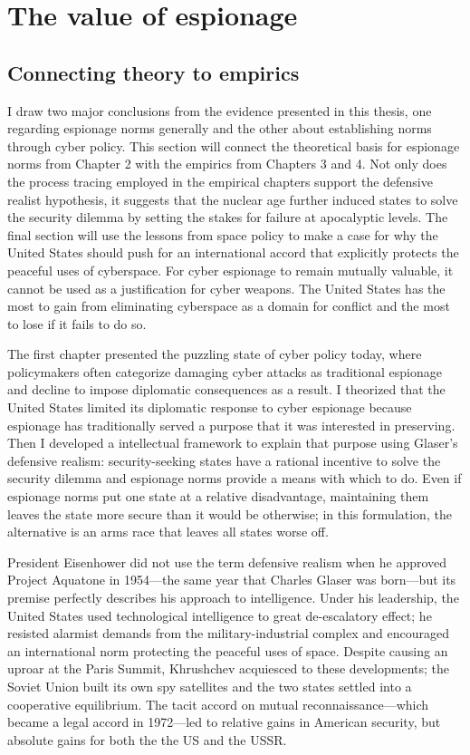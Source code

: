 \documentclass[11pt]{memoir}
\begin{document}
\section{The value of espionage}
\subsection{Connecting theory to empirics}
I draw two major conclusions from the evidence presented in this thesis, one regarding espionage norms generally and the other about establishing norms through cyber policy. This section will connect the theoretical basis for espionage norms from Chapter 2 with the empirics from Chapters 3 and 4. Not only does the process tracing employed in the empirical chapters support the defensive realist hypothesis, it suggests that the nuclear age further induced states to solve the security dilemma by setting the stakes for failure at apocalyptic levels. The final section will use the lessons from space policy to make a case for why the United States should push for an international accord that explicitly protects the peaceful uses of cyberspace. For cyber espionage to remain mutually valuable, it cannot be used as a justification for cyber weapons. The United States has the most to gain from eliminating cyberspace as a domain for conflict and the most to lose if it fails to do so.

The first chapter presented the puzzling state of cyber policy today, where policymakers often categorize damaging cyber attacks as traditional espionage and decline to impose diplomatic consequences as a result. I theorized that the United States limited its diplomatic response to cyber espionage because espionage has traditionally served a purpose that it was interested in preserving. Then I developed a intellectual framework to explain that purpose using Glaser's defensive realism: security-seeking states have a rational incentive to solve the security dilemma and espionage norms provide a means with which to do. Even if espionage norms put one state at a relative disadvantage, maintaining them leaves the state more secure than it would be otherwise; in this formulation, the alternative is an arms race that leaves all states worse off.

President Eisenhower did not use the term defensive realism when he approved Project Aquatone in 1954---the same year that Charles Glaser was born---but its premise perfectly describes his approach to intelligence. Under his leadership, the United States used technological intelligence to great de-escalatory effect; he resisted alarmist demands from the military-industrial complex and encouraged an international norm protecting the peaceful uses of space. Despite causing an uproar at the Paris Summit, Khrushchev acquiesced to these developments; the Soviet Union built its own spy satellites and the two states settled into a cooperative equilibrium. The tacit accord on mutual reconnaissance---which became a legal accord in 1972---led to relative gains in American security, but absolute gains for both the the US and the USSR.
\end{document}
